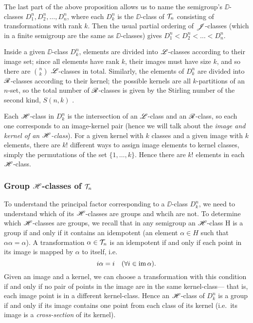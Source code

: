 The last part of the above proposition allows us to name the semigroup's
$\DD$-classes $D_1^n, D_2^n, \dots, D_n^n$, where each $D_k^n$ is the
$\DD$-class of $\mathcal{T}_n$ consisting of transformations with rank $k$.  Then the
usual partial ordering of $\mathrel{\mathscr{J}}$-classes (which in a finite semigroup are the
same as $\DD$-classes) gives $D_1^n < D_2^n < \dots < D_n^n$.

Inside a given $\DD$-class $D_k^n$, elements are divided into $\mathrel{\mathscr{L}}$-classes
according to their image set; since all elements have rank $k$, their images
must have size $k$, and so there are $\binom{n}{k}$ $\mathrel{\mathscr{L}}$-classes in total.
Similarly, the elements of $D_k^n$ are divided into $\mathrel{\mathscr{R}}$-classes according to
their kernel; the possible kernels are all $k$-partitions of an $n$-set, so the
total number of $\mathrel{\mathscr{R}}$-classes is given by the Stirling number of the second
kind, $S(n,k)$ .

Each $\mathrel{\mathscr{H}}$-class in $D_k^n$ is the intersection of an $\mathrel{\mathscr{L}}$-class and an
$\mathrel{\mathscr{R}}$-class, so each one corresponds to an image-kernel pair (hence we will talk
about the \textit{image and kernel of an $\mathrel{\mathscr{H}}$-class}).  For a given kernel with
$k$ classes and a given image with $k$ elements, there are $k!$ different ways
to assign image elements to kernel classes, simply the permutations of the set
$\{1, \dots, k\}$.  Hence there are $k!$ elements in each $\mathrel{\mathscr{H}}$-class.

\subsubsection{Group $\mathrel{\mathscr{H}}$-classes of $\mathcal{T}_n$}
To understand the principal factor corresponding to a $\DD$-class $D_k^n$, we need
to understand which of its $\mathrel{\mathscr{H}}$-classes are groups and whcih are not.  To
determine which $\mathrel{\mathscr{H}}$-classes are groups, we recall that in any semigroup an
$\mathrel{\mathscr{H}}$-class H is a group if and only if it contains an idempotent (an element
$\alpha \in H$ such that $\alpha \alpha = \alpha$).  A transformation
$\alpha \in \mathcal{T}_n$ is an idempotent if and only if each point in its image is
mapped by $\alpha$ to itself, i.e.
$$i \alpha = i \quad (\forall i \in \operatorname{im} \alpha).$$
Given an image and a kernel, we can choose a transformation with this condition
if and only if no pair of points in the image are in the same kernel-class---
that is, each image point is in a different kernel-class.  Hence an $\mathrel{\mathscr{H}}$-class
of $D_k^n$ is a group if and only if its image contains one point from each class
of its kernel (i.e.~its image is a \textit{cross-section} of its kernel).

